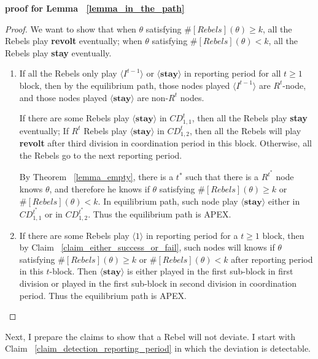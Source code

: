 \documentclass[12pt,letter]{article}
\theoremstyle{definition}
\theoremstyle{remark}
\theoremstyle{claim}
\begin{document}
\noindent \textbf{proof for Lemma ~\ref{lemma_in_the_path}}
\begin{proof}
We want to show that when $\theta$ satisfying $\#[Rebels](\theta)\geq k$, all the Rebels play \textbf{revolt} eventually; when $\theta$ satisfying $\#[Rebels](\theta)< k$, all the Rebels play \textbf{stay} eventually.
\begin{enumerate}
\item If all the Rebels only play $\langle I^{t-1} \rangle$ or $\langle \textbf{stay} \rangle$ in reporting period for all $t\geq 1$ block, then by the equilibrium path, those nodes played $\langle I^{t-1} \rangle$ are $R^t$-node, and those nodes played $\langle \textbf{stay} \rangle$ are non-$R^t$ nodes. 

If there are some Rebels play $\langle \textbf{stay} \rangle$ in $CD^t_{1,1}$, then all the Rebels play \textbf{stay} eventually; If $R^t$ Rebels play $\langle \textbf{stay} \rangle$ in $CD^t_{1,2}$, then all the Rebels will play \textbf{revolt} after third division in coordination period in this block. Otherwise, all the Rebels go to the next reporting period.

By Theorem ~\ref{lemma_empty}, there is a $t^{*}$ such that there is a $R^{t^{*}}$ node knows $\theta$, and therefore he knows if $\theta$ satisfying $\#[Rebels](\theta)\geq k$ or $\#[Rebels](\theta)< k$. In equilibrium path, such node play $\langle \textbf{stay} \rangle$ either in $CD^{t^{*}}_{1,1}$ or in $CD^{t^{*}}_{1,2}$. Thus the equilibrium path is APEX.

\item If there are some Rebels play $\langle 1 \rangle$ in reporting period for a $t\geq 1$ block, then by Claim ~\ref{claim_either_success_or_fail}, such nodes will knows if $\theta$ satisfying $\#[Rebels](\theta)\geq k$ or $\#[Rebels](\theta)< k$ after reporting period in this $t$-block. Then $\langle \textbf{stay} \rangle$ is either played in the first sub-block in first division or played in the first sub-block in second division in coordination period. Thus the equilibrium path is APEX.

 
\end{enumerate}

\end{proof}



Next, I prepare the claims to show that a Rebel will not deviate. I start with Claim ~\ref{claim_detection_reporting_period} in which the deviation is detectable.
\end{document}
